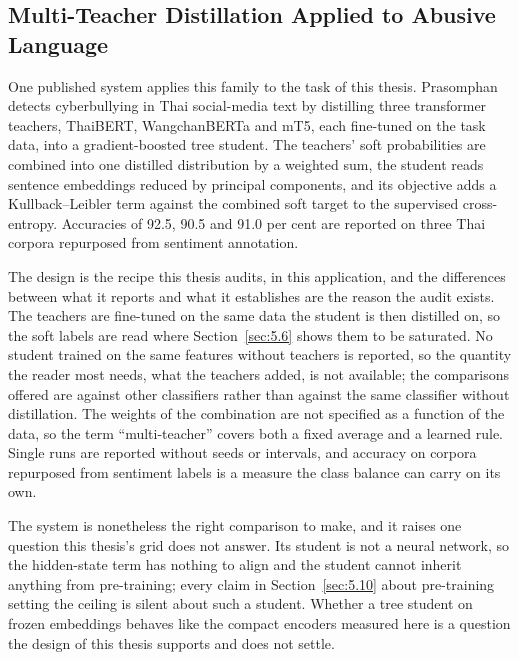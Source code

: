 \subsection{Multi-Teacher Distillation Applied to Abusive Language}
\label{sec:2.abusive}
One published system applies this family to the task of this thesis. Prasomphan \cite{prasomphan2025mtkd}
detects cyberbullying in Thai social-media text by distilling three transformer teachers, ThaiBERT,
WangchanBERTa and mT5, each fine-tuned on the task data, into a gradient-boosted tree student. The
teachers' soft probabilities are combined into one distilled distribution by a weighted sum, the student
reads sentence embeddings reduced by principal components, and its objective adds a Kullback--Leibler
term against the combined soft target to the supervised cross-entropy. Accuracies of 92.5, 90.5 and 91.0
per cent are reported on three Thai corpora repurposed from sentiment annotation.

The design is the recipe this thesis audits, in this application, and the differences between what it
reports and what it establishes are the reason the audit exists. The teachers are fine-tuned on the same
data the student is then distilled on, so the soft labels are read where Section~\ref{sec:5.6} shows
them to be saturated. No student trained on the same features without teachers is reported, so the
quantity the reader most needs, what the teachers added, is not available; the comparisons offered are
against other classifiers rather than against the same classifier without distillation. The weights of
the combination are not specified as a function of the data, so the term ``multi-teacher'' covers both a
fixed average and a learned rule. Single runs are reported without seeds or intervals, and accuracy on
corpora repurposed from sentiment labels is a measure the class balance can carry on its own.

The system is nonetheless the right comparison to make, and it raises one question this thesis's grid
does not answer. Its student is not a neural network, so the hidden-state term has nothing to align and
the student cannot inherit anything from pre-training; every claim in Section~\ref{sec:5.10} about
pre-training setting the ceiling is silent about such a student. Whether a tree student on frozen
embeddings behaves like the compact encoders measured here is a question the design of this thesis
supports and does not settle.

